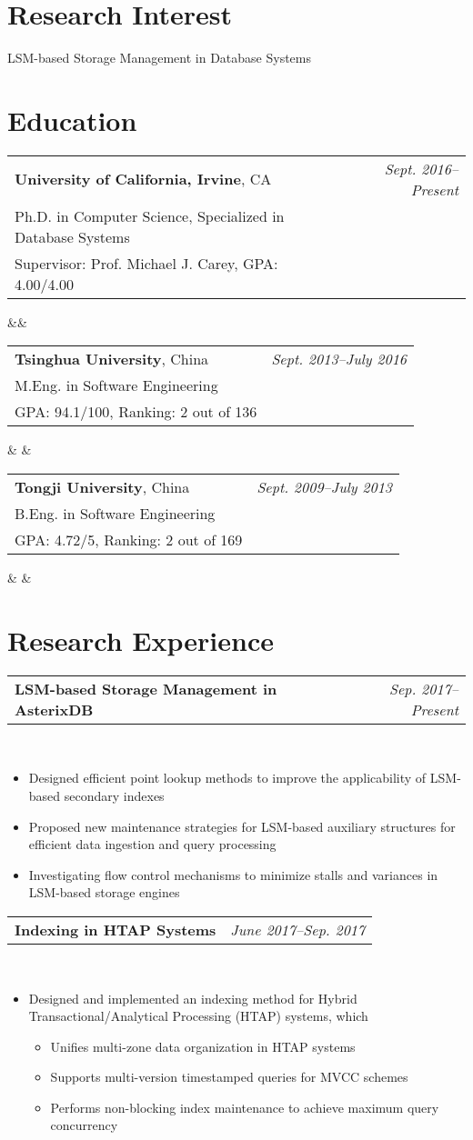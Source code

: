 \documentclass[11pt,a4paper,roman]{moderncv}        %
\makeatletter
\renewcommand*{\cventry}[7][1em]{
  \begin{tabular*}{\maincolumnwidth}{l@{\extracolsep{\fill}}r}%
    {#3} & {\small\itshape#2}\\%
    {#4} & \\
    {#6} & \\
  \end{tabular*}%
  \ifx&#7&%
  \else{\\%
    \begin{minipage}{\maincolumnwidth}%
      #7%
    \end{minipage}}\fi%
  \par\addvspace{#1}}
\newcommand{\cvexpr}[5][1em]{
  \begin{tabular*}{\maincolumnwidth}{l@{\extracolsep{\fill}}r}%
    {\textbf{#3}\ifthenelse{\equal{#4}{}}{}{, #4}} & {\small\itshape#2}%
  \end{tabular*}%
  \\
  \begin{minipage}{\maincolumnwidth}%
        #5%
  \end{minipage}%
  \par\addvspace{#1}
}
\makeatother
\begin{document}
\makecvtitle

\section{Research Interest}
LSM-based Storage Management in Database Systems

\section{Education}

\cventry{Sept. 2016--Present}{\textbf{University of California, Irvine}, CA}{Ph.D. in Computer 
Science, Specialized in Database Systems}{}{Supervisor: Prof. Michael J. Carey, GPA: 4.00/4.00}{}

\cventry{Sept. 2013--July 2016}{\textbf{Tsinghua University}, China}{M.Eng. in Software 
Engineering}{}{GPA: 94.1/100, Ranking: 2 out of 136}{
}
\cventry{Sept. 2009--July 2013}{\textbf{Tongji University}, China}{B.Eng. in Software Engineering}{}{GPA: 4.72/5, Ranking: 2 out of 169}{
}



\section{Research Experience}

\cvexpr{Sep. 2017--Present}{LSM-based Storage Management in AsterixDB}{University of California, Irvine}{
	\begin{itemize}
		\item Designed efficient point lookup methods to improve the applicability of LSM-based secondary indexes
		\item Proposed new maintenance strategies for LSM-based auxiliary structures for efficient data ingestion and query processing
		\item Investigating flow control mechanisms to minimize stalls and variances in LSM-based storage engines
	\end{itemize}
}


\cvexpr{June 2017--Sep. 2017}{Indexing in HTAP Systems}{IBM Almaden Research Center}{
	\begin{itemize}
		\item Designed and implemented an indexing method for Hybrid Transactional/Analytical Processing (HTAP) systems, which
		\begin{itemize}
			\item Unifies multi-zone data organization in HTAP systems
			\item Supports multi-version timestamped queries for MVCC schemes
			\item Performs non-blocking index maintenance to achieve maximum query concurrency
		\end{itemize}
	\end{itemize}
}
\end{document}
